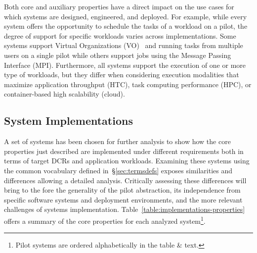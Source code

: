 \documentclass{sig-alternate}
\begin{document}
Both core and auxiliary properties have a direct impact on the use cases for
which \pilot systems are designed, engineered, and deployed. For example, while
every \pilot system offers the opportunity to schedule the tasks of a workload
on a pilot, the degree of support for specific workloads varies across
implementations. Some \pilot systems support Virtual Organizations
(VO)~\cite{foster2001} and running tasks from multiple users on a single pilot
while others support jobs using the Message Passing Interface
(MPI). Furthermore, all \pilot systems support the execution of one or more type
of workloads, but they differ when considering execution modalities that maximize
application throughput (HTC), task computing performance (HPC), or
container-based high scalability (cloud).



%
\subsection{\pilot System Implementations}
\label{sec:implementations}

A set of \pilot systems has been chosen for further analysis to show how the
core properties just described are implemented under different requirements both
in terms of target DCRs and application workloads. Examining these \pilot
systems using the common vocabulary defined in~\S\ref{sec:termsdefs} exposes
similarities and differences allowing a detailed analysis. Critically assessing
these differences will bring to the fore the generality of the pilot
abstraction, its independence from specific software systems and deployment
environments, and the more relevant challenges of \pilot systems implementation.
Table~\ref{table:implementations-properties} offers a summary of the core
properties for each analyzed \pilot system\protect\footnote{Pilot systems are
  ordered alphabetically in the table \& text.}.
\end{document}
